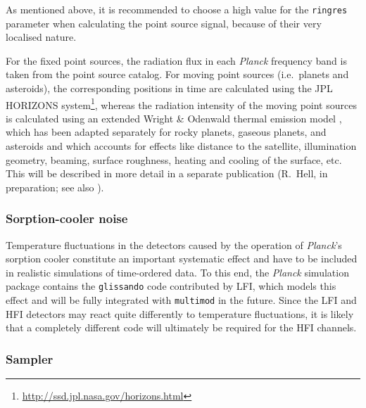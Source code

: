 \documentclass{aa}
\begin{document}
As mentioned above, it is recommended to choose a high value for the
{\tt ringres} parameter when calculating the point source signal, because
of their very localised nature.

For the fixed point sources, the radiation flux in each \emph{Planck} frequency
band is taken from the point source catalog. For moving point sources
(i.e.\ planets and asteroids), the corresponding positions in time are
calculated using the JPL HORIZONS system\footnote{\href{http://ssd.jpl.nasa.gov/horizons.html}{http://ssd.jpl.nasa.gov/horizons.html}}, whereas the radiation intensity of
the moving point sources is calculated using an extended Wright \& Odenwald
thermal emission model \citep{wright-1976,neugebauer-etal-1971},
which has been adapted separately for rocky planets,
gaseous planets, and asteroids and which
accounts for effects like distance to the satellite, illumination
geometry, beaming, surface roughness, heating and cooling of the surface, etc.
This will be described in more detail in a separate publication
(R.\ Hell, in preparation; see also \citealt{schaefer-etal-2004b}).

\subsubsection {Sorption-cooler noise}
\label{scnoise}

Temperature fluctuations in the detectors caused by the operation of
\emph{Planck}'s sorption cooler constitute an important systematic
effect and have to be included in realistic simulations of
time-ordered data.  To this end, the \emph{Planck} simulation package
contains the {\tt glissando} code contributed by LFI, which models
this effect and will be fully integrated with {\tt multimod}
in the future. Since the LFI and HFI detectors may react quite
differently to temperature fluctuations, it is likely that a
completely different code will ultimately be required for the HFI
channels.

\subsubsection {Sampler}
\label{sampler}
\end{document}
